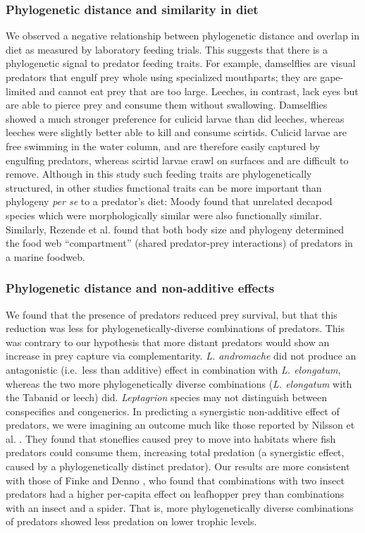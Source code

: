 \subsubsection{Phylogenetic distance and similarity in
diet}\label{phylogenetic-distance-and-similarity-in-diet}

We observed a negative relationship between phylogenetic distance and
overlap in diet as measured by laboratory feeding trials. This suggests
that there is a phylogenetic signal to predator feeding traits. For
example, damselflies are visual predators that engulf prey whole using
specialized mouthparts; they are gape-limited and cannot eat prey that
are too large. Leeches, in contrast, lack eyes but are able to pierce
prey and consume them without swallowing. Damselflies showed a much
stronger preference for culicid larvae than did leeches, whereas leeches
were slightly better able to kill and consume scirtids. Culicid larvae
are free swimming in the water column, and are therefore easily captured
by engulfing predators, whereas scirtid larvae crawl on surfaces and are
difficult to remove. Although in this study such feeding traits are
phylogenetically structured, in other studies functional traits can be
more important than phylogeny \emph{per se} to a predator's diet: Moody
\citeyearpar{Moody1993} found that unrelated decapod species which were
morphologically similar were also functionally similar. Similarly,
Rezende et al. \citeyearpar{Rezende2009} found that both body size and
phylogeny determined the food web ``compartment'' (shared predator-prey
interactions) of predators in a marine foodweb.

\subsubsection{Phylogenetic distance and non-additive
effects}\label{phylogenetic-distance-and-non-additive-effects}

We found that the presence of predators reduced prey survival, but that
this reduction was less for phylogenetically-diverse combinations of
predators. This was contrary to our hypothesis that more distant
predators would show an increase in prey capture via complementarity.
\emph{L. andromache} did not produce an antagonistic (i.e.~less than
additive) effect in combination with \emph{L. elongatum}, whereas the
two more phylogenetically diverse combinations (\emph{L. elongatum} with
the Tabanid or leech) did. \emph{Leptagrion} species may not distinguish
between conspecifics and congenerics. In predicting a synergistic
non-additive effect of predators, we were imagining an outcome much like
those reported by Nilsson et al. \citeyearpar{Nilsson2006c}. They found
that stoneflies caused prey to move into habitats where fish predators
could consume them, increasing total predation (a synergistic effect,
caused by a phylogenetically distinct predator). Our results are more
consistent with those of Finke and Denno \citeyearpar{Finke2005}, who
found that combinations with two insect predators had a higher
per-capita effect on leafhopper prey than combinations with an insect
and a spider. That is, more phylogenetically diverse combinations of
predators showed less predation on lower trophic levels.

